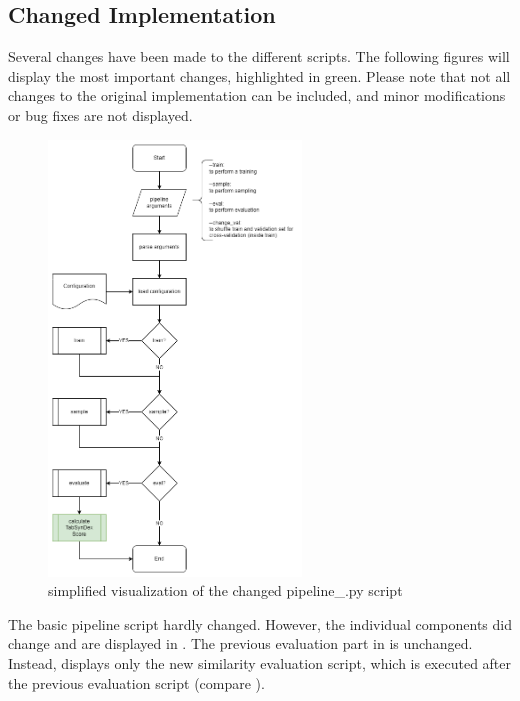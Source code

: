 \subsection[]{Changed Implementation}
\label{A:Changed_implementation}

Several changes have been made to the different scripts.
The following figures will display the most important changes, highlighted in green.
Please note that not all changes to the original implementation can be included, and minor modifications or bug fixes are not displayed.

\begin{figure}[H]
	\centering
	\includegraphics[width=0.6\textwidth]{images/pipeline-CHANGED.png}
	\caption[Pipeline Script Changes]{simplified visualization of the changed pipeline\_\*.py script}
	\label{fig:a_pipeline_changed}
\end{figure}

The basic pipeline script hardly changed.
However, the individual components did change and are displayed in .
The previous evaluation part in  is unchanged.
Instead,  displays only the new similarity evaluation script, which is
executed after the previous evaluation script (compare ).

